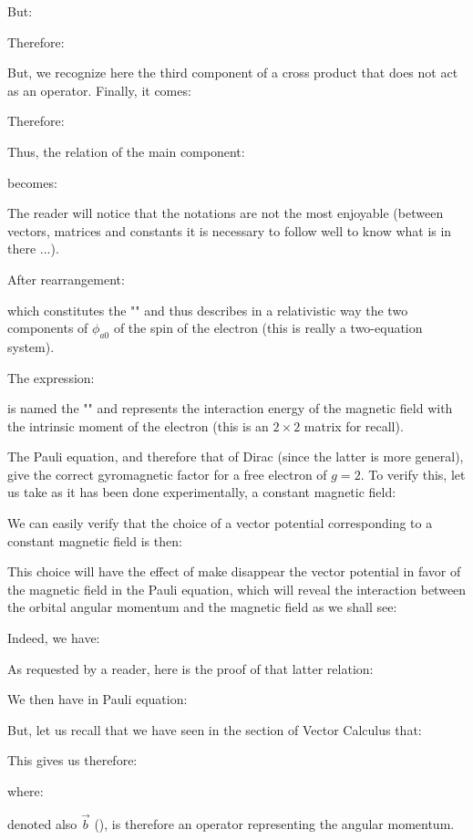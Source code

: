 	But:
	
	Therefore:
	 
	But, we recognize here the third component of a cross product that does not act as an operator. Finally, it comes:
	
	Therefore:
	
	Thus, the relation of the main component:
	
	becomes:
	
	The reader will notice that the notations are not the most enjoyable (between vectors, matrices and constants it is necessary to follow well to know what is in there ...).

	After rearrangement:
	
	which constitutes the "" and thus describes in a relativistic way the two components of $\phi_{a0}$ of the spin of the electron (this is really a two-equation system).

	The expression:
	
	is named the "" and represents the interaction energy of the magnetic field with the intrinsic moment of the electron (this is an $2\times 2$ matrix for recall).

	The Pauli equation, and therefore that of Dirac (since the latter is more general), give the correct gyromagnetic factor for a free electron of $g=2$. To verify this, let us take as it has been done experimentally, a constant magnetic field:

	We can easily verify that the choice of a vector potential corresponding to a constant magnetic field is then:
	
	This choice will have the effect of make disappear the vector potential in favor of the magnetic field in the Pauli equation, which will reveal the interaction between the orbital angular momentum and the magnetic field as we shall see:

	Indeed, we have:
	
	As requested by a reader, here is the proof of that latter relation:
	
	We then have in Pauli equation:
	
	But, let us recall that we have seen in the section of Vector Calculus that:
	
	This gives us therefore:
	
	where:
	
	denoted also $\vec{b}$ (), is therefore an operator representing the angular momentum.

